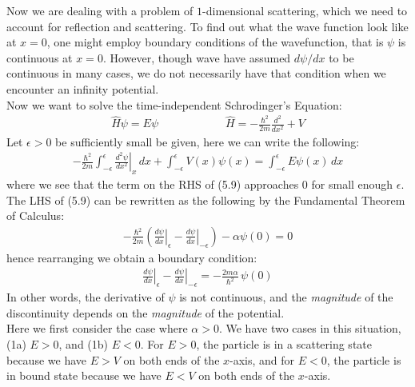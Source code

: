 \documentclass[11pt]{book}
\theoremstyle{break}
\theoremstyle{break}
\begin{document}
Now we are dealing with a problem of $1$-dimensional scattering, which we need to account for reflection and scattering. To find out what the wave function look like at $x = 0$, one might employ boundary conditions of the wavefunction, that is $\psi$ is continuous at $x = 0$. However, though wave have assumed $d\psi/dx$ to be continuous in many cases, we do not necessarily have that condition when we encounter an infinity potential. \\

Now we want to solve the time-independent Schrodinger's Equation:
\begin{align}
\hat{H}\psi = E\psi \qquad\qquad\qquad \hat{H} = -\frac{\hbar^2}{2m}\frac{d^2}{dx^2}+V
\end{align}
Let $\epsilon>0$ be sufficiently small be given, here we can write the following:
\begin{align}
-\frac{\hbar^2}{2m}\int_{-\epsilon}^\epsilon \left.\frac{d^2 \psi}{dx^2}\right|_x \, dx + \int_{-\epsilon}^\epsilon V(x)\psi(x) = \int_{-\epsilon}^\epsilon E\psi(x) \, dx
\end{align}
where we see that the term on the RHS of (5.9) approaches $0$ for small enough $\epsilon$. The LHS of (5.9) can be rewritten as the following by the Fundamental Theorem of Calculus:
\begin{align*}
-\frac{\hbar^2}{2m}\left( \left.\frac{d\psi}{dx}\right|_\epsilon - \left. \frac{d\psi}{dx}\right|_{-\epsilon}\right) -\alpha \psi(0) =0
\end{align*}
hence rearranging we obtain a boundary condition:
\begin{align}
 \left.\frac{d\psi}{dx}\right|_\epsilon - \left. \frac{d\psi}{dx}\right|_{-\epsilon} = -\frac{2m\alpha}{\hbar^2}\,\psi(0)
\end{align}
In other words, the derivative of $\psi$ is not continuous, and the \textit{magnitude} of the discontinuity depends on the \textit{magnitude} of the potential. \\

Here we first consider the case where $\alpha>0$. We have two cases in this situation, (1a) $E>0$, and (1b) $E<0$. For $E>0$, the particle is in a scattering state because we have $E > V$ on both ends of the $x$-axis, and for $E<0$, the particle is in bound state because we have $E<V$ on both ends of the $x$-axis.\\
\end{document}
